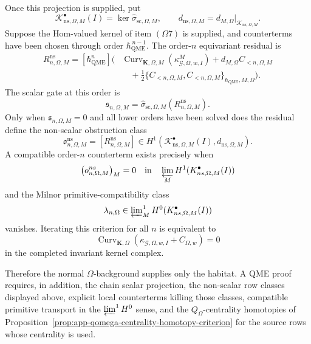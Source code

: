 \begin{thm}
  Once this projection is supplied, put
  \[
    \mathcal K^\bullet_{\mathrm{ns},\Omega,M}(I)
      =
    \ker\widehat\sigma_{\mathrm{sc},\Omega,M},
    \qquad
    d_{\mathrm{ns},\Omega,M}
      =
    d_{M,\Omega}|_{\mathcal K_{\mathrm{ns},\Omega,M}} .
  \]
  Suppose the Hom-valued kernel of item \((\Omega7)\) is supplied, and
  counterterms have been chosen through order
  \(\hbar_{\mathrm{QME}}^{\,n-1}\).  The
  order-\(n\) equivariant residual is
  \[
  \begin{aligned}
    R^{\mathrm{ns}}_{n,\Omega,M}
      =
    [\hbar_{\mathrm{QME}}^n]\biggl(
      &\operatorname{Curv}_{\mathbf K,\Omega,M}
        (\kappa^M_{\mathcal G,\Omega,w,I})
       +d_{M,\Omega}C_{<n,\Omega,M} \\
      &\quad
       +\frac12
        \{C_{<n,\Omega,M},C_{<n,\Omega,M}\}
          _{\hbar_{\mathrm{QME}},M,\Omega}
    \biggr).
  \end{aligned}
  \]
  The scalar gate at this order is
  \[
    \mathfrak s_{n,\Omega,M}
      =
    \widehat\sigma_{\mathrm{sc},\Omega,M}
      (R^{\mathrm{ns}}_{n,\Omega,M}).
  \]
  Only when \(\mathfrak s_{n,\Omega,M}=0\) and all lower orders have been
  solved does the residual define the non-scalar obstruction class
  \[
    \mathfrak o^{\mathrm{ns}}_{n,\Omega,M}
      =
    [R^{\mathrm{ns}}_{n,\Omega,M}]
      \in
    H^1\!\left(
      \mathcal K^\bullet_{\mathrm{ns},\Omega,M}(I),
      d_{\mathrm{ns},\Omega,M}
    \right).
  \]
  A compatible order-\(n\) counterterm exists precisely when
  \[
    \bigl(\mathfrak o^{\mathrm{ns}}_{n,\Omega,M}\bigr)_M=0
    \quad\text{in}\quad
    \varprojlim_M
    H^1(\mathcal K^\bullet_{\mathrm{ns},\Omega,M}(I))
  \]
  and the Milnor primitive-compatibility class
  \[
    \lambda_{n,\Omega}
      \in
    \varprojlim\nolimits^1_M
    H^0(\mathcal K^\bullet_{\mathrm{ns},\Omega,M}(I))
  \]
  vanishes.  Iterating this criterion for all \(n\) is equivalent to
  \[
    \operatorname{Curv}_{\mathbf K,\Omega}
      (\kappa_{\mathcal G,\Omega,w,I}+C_{\Omega,w})
      =0
  \]
  in the completed invariant kernel complex.

  Therefore the normal \(\Omega\)-background supplies only the habitat.
  A QME proof requires, in addition, the chain scalar projection, the
  non-scalar row classes displayed above, explicit local counterterms
  killing those classes, compatible primitive transport in the
  \(\varprojlim^1H^0\) sense, and the \(Q_\Omega\)-centrality homotopies of
  Proposition~\ref{prop:app-qomega-centrality-homotopy-criterion} for the
  source rows whose centrality is used.
\end{thm}


